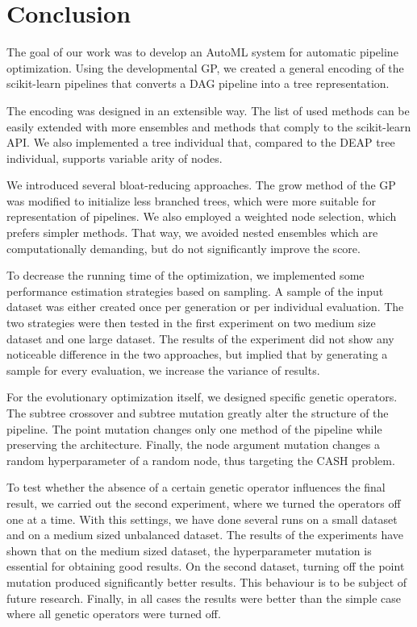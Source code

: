 \chapter*{Conclusion}

The goal of our work was to develop an AutoML system for automatic
pipeline optimization. Using the developmental GP, we created a general encoding
of the scikit-learn pipelines that converts a DAG pipeline into a tree representation.

The encoding was designed in an extensible way. The list of used methods can be easily 
extended with more ensembles and methods that comply to the scikit-learn API.
We also implemented a tree individual that, compared to the DEAP tree individual, supports
variable arity of nodes.

We introduced several bloat-reducing approaches. The grow method of the GP was
modified to initialize less branched trees, which were more suitable for representation
of pipelines. We also employed a weighted node selection, which prefers simpler methods.
That way, we avoided nested ensembles which are computationally demanding, but do not
significantly improve the score. 

To decrease the running time of the optimization, we implemented some performance
estimation strategies based on sampling. A sample of the input dataset was either
created once per generation or per individual evaluation. The two strategies were
then tested in the first experiment on two medium size dataset and one large dataset.
The results of the experiment did not show any noticeable difference in
the two approaches, but implied that by generating a sample for every evaluation, we
increase the variance of results.

For the evolutionary optimization itself, we designed specific genetic operators. The
subtree crossover and subtree mutation greatly alter the structure of the pipeline.
The point mutation changes only one method of the pipeline while preserving the
architecture. Finally, the node argument mutation changes a random hyperparameter of
a random node, thus targeting the CASH problem.

To test whether the absence of a certain genetic operator influences the final result,
we carried out the second experiment, where we turned the operators off one at a time.
With this settings, we have done several runs on a small dataset and on a medium sized
unbalanced dataset. The results of the experiments have shown that on the medium
sized dataset, the hyperparameter mutation is essential for obtaining good results.
On the second dataset, turning off the point mutation produced significantly better
results. This behaviour is to be subject of future research. Finally, in all cases
the results were better than the simple case where all genetic operators were turned
off.

